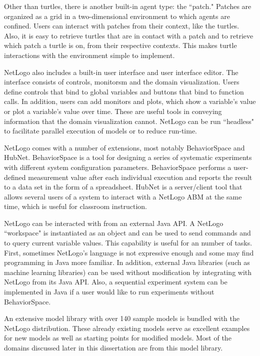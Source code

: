 Other than turtles, there is another built-in agent type: the ``patch."
Patches are organized as a grid in a two-dimensional environment to which agents are confined.
Users can interact with patches from their context, like the turtles.
Also, it is easy to retrieve turtles that are in contact with a patch and to retrieve which patch a turtle is on, from their respective contexts.
This makes turtle interactions with the environment simple to implement.

NetLogo also includes a built-in user interface and user interface editor.
The interface consists of controls, monitorsm and the domain visualization.
Users define controls that bind to global variables and buttons that bind to function calls.
In addition, users can add monitors and plots, which show a variable's value or plot a variable's value over time.
These are useful tools in conveying information that the domain visualization cannot.
NetLogo can be run ``headless" to facilitate parallel execution of models or to reduce run-time.

NetLogo comes with a number of extensions, most notably BehaviorSpace and HubNet.
BehaviorSpace is a tool for designing a series of systematic experiments with different system configuration parameters.
BehaviorSpace performs a user-defined measurement value after each individual execution and reports the result to a data set in the form of a spreadsheet.
HubNet is a server/client tool that allows several users of a system to interact with a NetLogo ABM at the same time, which is useful for classroom instruction.

NetLogo can be interacted with from an external Java API.
A NetLogo ``workspace" is instantiated as an object and can be used to send commands and to query current variable values.
This capability is useful for an number of tasks.
First, sometimes NetLogo's language is not expressive enough and some may find programming in Java more familiar.
In addition, external Java libraries (such as machine learning libraries) can be used without modification by integrating with NetLogo from its Java API.
Also, a sequential experiment system can be implemented in Java if a user would like to run experiments without BehaviorSpace.

An extensive model library with over 140 sample models is bundled with the NetLogo distribution.
These already existing models serve as excellent examples for new models as well as starting points for modified models.
Most of the domains discussed later in this dissertation are from this model library.

